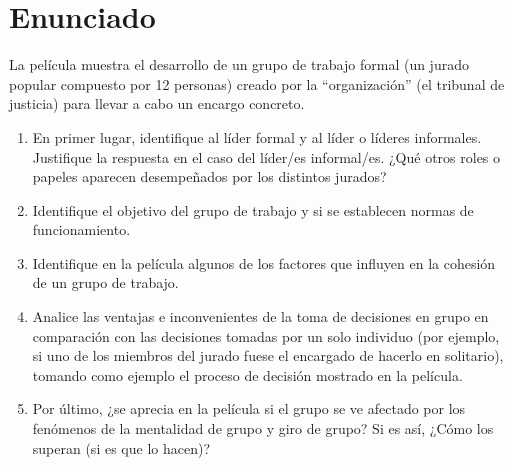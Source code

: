 \documentclass{article}
\begin{document}


\section{Enunciado}

La película muestra el desarrollo de un grupo de trabajo formal (un jurado popular compuesto por 12
personas) creado por la “organización” (el tribunal de justicia) para llevar a cabo un encargo concreto.

\begin{enumerate}
    \item En primer lugar, identifique al líder formal y al líder o líderes informales. Justifique la respuesta en el caso del
    líder/es informal/es. ¿Qué otros roles o papeles aparecen desempeñados por los distintos jurados?
    \item Identifique el objetivo del grupo de trabajo y si se establecen normas de funcionamiento.
    \item Identifique en la película algunos de los factores que influyen en la cohesión de un grupo de trabajo.
    \item Analice las ventajas e inconvenientes de la toma de decisiones en grupo en comparación con las decisiones tomadas por un solo individuo (por ejemplo, si uno de los miembros del jurado fuese el encargado de hacerlo en solitario), tomando como ejemplo el proceso de decisión mostrado en la película.
    \item Por último, ¿se aprecia en la película si el grupo se ve afectado por los fenómenos de la mentalidad de grupo y giro de grupo? Si es así, ¿Cómo los superan (si es que lo hacen)?
\end{enumerate}
\end{document}
